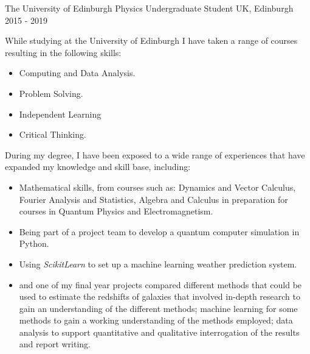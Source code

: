 
 \cventry
    {The University of Edinburgh} %
    {Physics Undergraduate Student} %
    {UK, Edinburgh} %
    {2015 - 2019} %
    {
      While studying at the University of Edinburgh I have taken a range of courses resulting in the following skills: 
      \begin{itemize}
          \item Computing and Data Analysis.
          \item Problem Solving.
          \item Independent Learning
          \item Critical Thinking.
      \end{itemize}
      During my degree, I have been exposed to a wide range of experiences that have expanded my knowledge and skill base, including:
      \begin{itemize}
          \item Mathematical skills, from courses such as: Dynamics and Vector Calculus, Fourier Analysis and Statistics, Algebra and Calculus in preparation for courses in Quantum Physics and Electromagnetism.
          \item Being part of a project team to develop a quantum computer simulation in Python.
          \item Using \textit{ScikitLearn} to set up a machine learning weather prediction system.
          \item and one of my final year projects compared different methods that could be used to estimate the redshifts of galaxies that involved in-depth research to gain an understanding of the different methods; machine learning for some methods to gain a working understanding of the methods employed; data analysis to support quantitative and qualitative interrogation of the results and report writing.\newline
      \end{itemize}
      }
